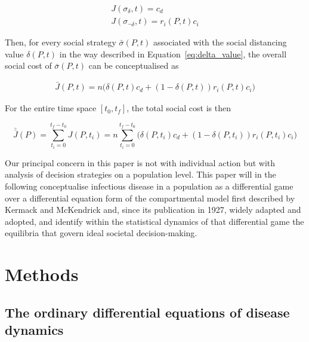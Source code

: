 \documentclass{article}
\begin{document}
\begin{equation}
	\begin{aligned}
		J(\sigma_{\delta}, t) = c_d 									\\
		J(\sigma_{\lnot \delta}, t) = r_i(P, t) c_i
	\end{aligned}
	\label{eq:pure_time_dependent_costs}
\end{equation}

Then, for every social strategy $\bar{\sigma}(P, t)$ associated with the social distancing value $\delta(P, t)$ in the way described in Equation~\eqref{eq:delta_value}, the overall social cost of $\bar{\sigma}(P, t)$ can be conceptualised as

\begin{equation}
	\begin{aligned}
		\bar{J}(P, t) = n \Big( \delta(P, t) c_d + (1-\delta(P, t)) r_i(P, t) c_i \Big)
	\end{aligned}
	\label{eq:social_time_dependent_costs}
\end{equation}

For the entire time space $[t_0, t_f]$, the total social cost is then

\begin{equation}
	\bar{\bar{J}}(P) = \sum_{t_i = 0}^{t_f - t_0} J(P, t_i) = n \sum_{t_i = 0}^{t_f - t_0} \Big( \delta(P, t_i) c_d + (1 - \delta(P, t_i)) r_i(P, t_i) c_i \Big)
\end{equation}

Our principal concern in this paper is not with individual action but with analysis of decision strategies on a population level. This paper will in the following conceptualise infectious disease in a population as a differential game over a differential equation form of the compartmental model first described by Kermack and McKendrick\cite{kermack1927contribution} and, since its publication in 1927, widely adapted and adopted,\cite{vstvepan2007kermack,roberts1999kermack,capasso1978generalization} and identify within the statistical dynamics of that differential game the equilibria that govern ideal societal decision-making.


\section{Methods} %
\label{sec:methods}

\subsection{The ordinary differential equations of disease dynamics} %
\label{sub:the_ordinary_differential_equations_of_disease_dynamics}
\end{document}
